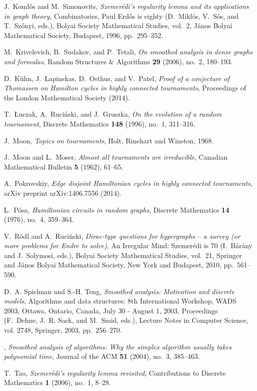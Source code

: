 \documentclass[11pt,english]{article}
\theoremstyle{plain}
\theoremstyle{definition}
\theoremstyle{definition}
\theoremstyle{plain}
\theoremstyle{plain}
\theoremstyle{plain}
\theoremstyle{plain}
\theoremstyle{remark}
\theoremstyle{remark}
\begin{document}
\begin{thebibliography}{10}
J.~Koml\'os and M.~Simonovits, \emph{Szemer\'edi's regularity lemma and its
  applications in graph theory}, Combinatorics, {P}aul {E}rd\H{o}s is eighty
  (D.~Mikl\'os, V.~S\'os, and T.~Sz\H{o}nyi, eds.), Bolyai Society Mathematical
  Studies, vol.~2, J\'anos {B}olyai Mathematical Society, Budapest, 1996,
  pp.~295--352.

M.~Krivelevich, B.~Sudakov, and P.~Tetali, \emph{On smoothed analysis in dense
  graphs and formulas}, Random Structures \& Algorithms \textbf{29} (2006),
  no.~2, 180--193.

D.~K{\"u}hn, J.~Lapinskas, D.~Osthus, and V.~Patel, \emph{Proof of a conjecture
  of {T}homassen on {H}amilton cycles in highly connected tournaments},
  Proceedings of the London Mathematical Society (2014).

T.~{\L}uczak, A.~Ruci{\'n}ski, and J.~Gruszka, \emph{On the evolution of a
  random tournament}, Discrete Mathematics \textbf{148} (1996), no.~1,
  311--316.

J.~Moon, \emph{Topics on tournaments}, Holt, Rinehart and Winston, 1968.

J.~Moon and L.~Moser, \emph{Almost all tournaments are irreducible}, Canadian
  Mathematical Bulletin \textbf{5} (1962), 61--65.

A.~Pokrovskiy, \emph{Edge disjoint {H}amiltonian cycles in highly connected
  tournaments}, arXiv preprint arXiv:1406.7556 (2014).

L.~P{\'o}sa, \emph{{H}amiltonian circuits in random graphs}, Discrete
  Mathematics \textbf{14} (1976), no.~4, 359--364.

V.~R{\"o}dl and A.~Ruci{\'n}ski, \emph{Dirac-type questions for hypergraphs --
  a survey (or more problems for {E}ndre to solve)}, An Irregular Mind:
  Szemer\'edi is 70 (I.~B\'ar\'any and J.~Solymosi, eds.), Bolyai Society
  Mathematical Studies, vol.~21, Springer and J\'anos Bolyai Mathematical
  Society, New York and Budapest, 2010, pp.~561--590.

D.~A. Spielman and S.-H. Teng, \emph{Smoothed analysis: Motivation and discrete
  models}, Algorithms and data structures: 8th International Workshop, WADS
  2003, Ottawa, Ontario, Canada, July 30 - August 1, 2003, Proceedings
  (F.~Dehne, J.~R. Sack, and M.~Smid, eds.), Lecture Notes in Computer Science,
  vol. 2748, Springer, 2003, pp.~256--270.

\bysame, \emph{Smoothed analysis of algorithms: Why the simplex algorithm
  usually takes polynomial time}, Journal of the ACM \textbf{51} (2004), no.~3,
  385--463.

T.~Tao, \emph{Szemer\'edi's regularity lemma revisited}, Contributions to
  Discrete Mathematics \textbf{1} (2006), no.~1, 8--28.

\end{thebibliography}
\end{document}
